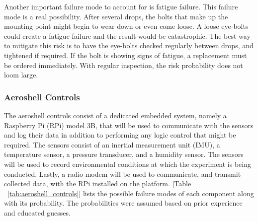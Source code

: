 Another important failure mode to account for is fatigue failure. This failure mode is a real possibility. After several drops, the bolts that make up the mounting point might begin to wear down or even come loose. A loose eye-bolts could create a fatigue failure and the result would be catastrophic. The best way to mitigate this risk is to have the eye-bolts checked regularly between drops, and tightened if required. If the bolt is showing signs of fatigue, a replacement must be ordered immediately. With regular inspection, the risk probability does not loom large. 


\subsubsection{\label{sss:aeroshell_controls} Aeroshell Controls}

\indent\indent The aeroshell controls consist of a dedicated embedded system, namely a Raspberry Pi (RPi) model 3B, that will be used to communicate with the sensors and log their data in addition to performing any logic control that might be required. The sensors consist of an inertial measurement unit (IMU), a temperature sensor, a pressure transducer, and a humidity sensor. The sensors will be used to record environmental conditions at which the experiment is being conducted. Lastly, a radio modem will be used to communicate, and transmit collected data, with the RPi installed on the platform. [Table ~\ref{tab:aeroshell_controls}] lists the possible failure modes of each component along with its probability. The probabilities were assumed based on prior experience and educated guesses.

